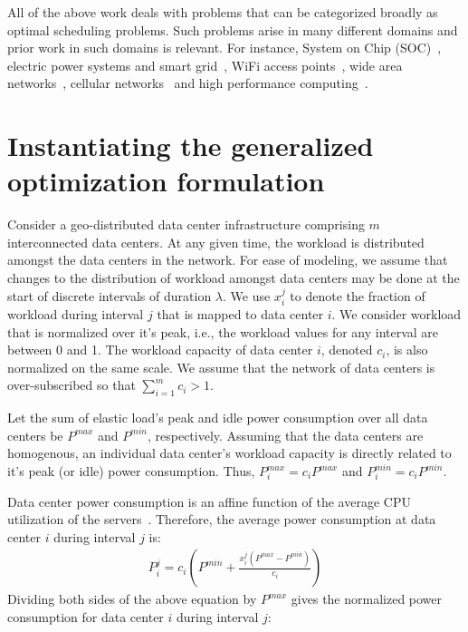 All of the above work deals with problems that can be categorized broadly as optimal scheduling problems. Such problems arise in many different domains and prior work in such domains is relevant. For instance, System on Chip (SOC)~\cite{Fang:2011:COP:1995896.1995940}, electric power systems and smart grid~\cite{Javed:2008:ULP:1485753.1485792,Logenthiran2011138,Celli:2001:PICA,FahadJavedAdOpt.SASO.2009.26}, WiFi access points~\cite{Marsan:2010:SAM:1791314.1791340}, wide area networks~\cite{Cavdar:2011:ECOC}, cellular networks~\cite{Peng:2011:TPS:2030613.2030628} and high performance computing~\cite{Lee:ServerConsolidation:2011:Globecom,Pinheiro01loadbalancing,Yao:DCPowerReduction:2012:INFOCOM,Herodotou:Starfish:2011:CIDR,Herodotou:2011:NOS:2038916.2038934,Aikema:ElecCostHPC:2011:ISSST}.

\section{Instantiating the generalized optimization formulation}\label{sec:case1:instantiating} %
Consider a geo-distributed data center infrastructure
comprising $m$ interconnected data
centers. At any given time, the workload is distributed amongst the data
centers in the network. For ease of modeling, we assume that changes to the distribution of workload amongst data centers may be done at the start of discrete intervals of duration $\lambda$. We use $x_i^j$ to denote the fraction of workload during interval $j$ that is mapped to data center $i$.  We consider workload that is normalized over it's peak, i.e., the workload values for any interval are between 0 and 1. The workload capacity of data center $i$, denoted $c_i$, is also normalized on the same scale. We assume that the network of data centers is over-subscribed so that $\sum_{i=1}^m c_i > 1$.

Let the sum of elastic load's peak and idle power consumption over all data centers be $P^{max}$ and $P^{min}$, respectively. Assuming that the data centers are homogenous, an individual data center's workload capacity is directly related to it's peak (or idle) power consumption. Thus, $P_i^{max} = c_iP^{max}$ and $P_i^{min} = c_iP^{min}$. 

Data center power consumption is an affine function of the average CPU utilization of the servers~\cite{Fan:power:ICSA:2007}. Therefore, the average power consumption at data center $i$ during interval $j$ is: 
\begin{align}
P_i^j = c_i \left(P^{min}+\frac{x_i^j\left(P^{max}-P^{min}\right)}{c_i}\right)
\end{align}
Dividing both sides of the above equation by $P^{max}$ gives the normalized power consumption for data center $i$ during interval $j$:

